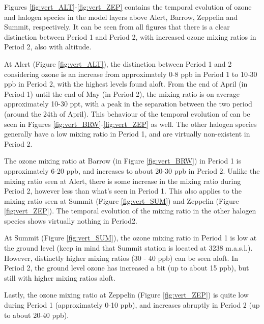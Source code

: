 %


\medskip

Figures \ref{fig:vert_ALT}-\ref{fig:vert_ZEP} contains the temporal evolution of ozone and halogen species in the model layers above Alert, Barrow, Zeppelin and Summit, respectively. It can be seen from all figures that there is a clear distinction between Period 1 and Period 2, with increased ozone mixing ratios in Period 2, also with altitude. 

\medskip

At Alert (Figure \ref{fig:vert_ALT}), the distinction between Period 1 and 2 considering ozone is an increase from approximately 0-8 ppb in Period 1 to 10-30 ppb in Period 2, with the highest levels found aloft. From the end of April (in Period 1) until the end of May (in Period 2), the  mixing ratio is on average approximately 10-30 ppt, with a peak in the separation between the two period (around the 24th of April). This behaviour of the temporal evolution of  can be seen in Figures \ref{fig:vert_BRW}-\ref{fig:vert_ZEP} as well. The other halogen species generally have a low mixing ratio in Period 1, and are virtually non-existent in Period 2. 

\medskip

The ozone mixing ratio at Barrow (in Figure \ref{fig:vert_BRW}) in Period 1 is approximately 6-20 ppb, and increases to about 20-30 ppb in Period 2. Unlike the  mixing ratio seen at Alert, there is some increase in the mixing ratio during Period 2, however less than what's seen in Period 1. This also applies to the  mixing ratio seen at Summit (Figure \ref{fig:vert_SUM}) and Zeppelin (Figure \ref{fig:vert_ZEP}). The temporal evolution of the mixing ratio in the other halogen species shows virtually nothing in Period2.

\medskip

At Summit (Figure \ref{fig:vert_SUM}), the ozone mixing ratio in Period 1 is low at the ground level (keep in mind that Summit station is located at 3238 m.a.s.l.). However, distinctly higher mixing ratios (30 - 40 ppb) can be seen aloft. In Period 2, the ground level ozone has increased a bit (up to about 15 ppb), but still with higher mixing ratios aloft. 

\medskip

Lastly, the ozone mixing ratio at Zeppelin (Figure \ref{fig:vert_ZEP}) is quite low during Period 1 (approximately 0-10 ppb), and increases abruptly in Period 2 (up to about 20-40 ppb). 


